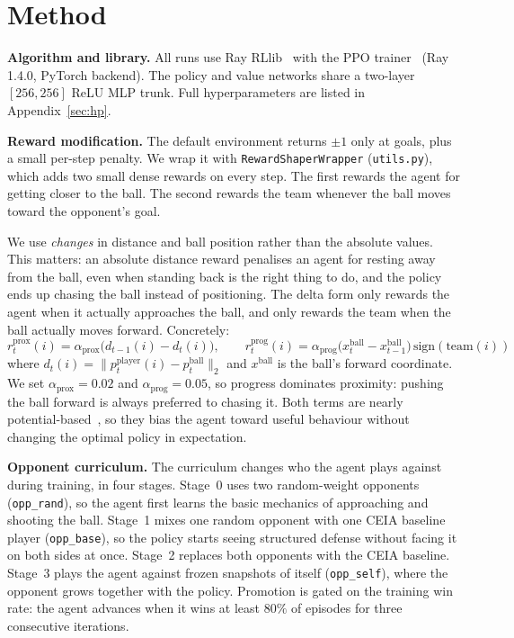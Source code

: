 \documentclass{article}
\begin{document}
\section{Method}
\label{sec:method}

\textbf{Algorithm and library.}
All runs use Ray RLlib~\citep{Liang2018RLlib} with the PPO trainer~\citep{Schulman2017PPO} (Ray 1.4.0, PyTorch backend).
The policy and value networks share a two-layer $[256,256]$ ReLU MLP trunk.
Full hyperparameters are listed in Appendix~\ref{sec:hp}.

\textbf{Reward modification.}
The default environment returns $\pm 1$ only at goals, plus a small per-step penalty.
We wrap it with \texttt{RewardShaperWrapper} (\texttt{utils.py}), which adds two small dense rewards on every step.
The first rewards the agent for getting closer to the ball.
The second rewards the team whenever the ball moves toward the opponent's goal.

We use \emph{changes} in distance and ball position rather than the absolute values.
This matters: an absolute distance reward penalises an agent for resting away from the ball, even when standing back is the right thing to do, and the policy ends up chasing the ball instead of positioning.
The delta form only rewards the agent when it actually approaches the ball, and only rewards the team when the ball actually moves forward.
Concretely:
\begin{equation}
r^{\text{prox}}_t(i) = \alpha_{\text{prox}}\bigl(d_{t-1}(i)-d_t(i)\bigr), \qquad
r^{\text{prog}}_t(i) = \alpha_{\text{prog}}\bigl(x^{\text{ball}}_t - x^{\text{ball}}_{t-1}\bigr)\,\mathrm{sign}(\mathrm{team}(i))
\label{eq:shaping}
\end{equation}
where $d_t(i)=\lVert p^{\text{player}}_t(i)-p^{\text{ball}}_t\rVert_2$ and $x^{\text{ball}}$ is the ball's forward coordinate.
We set $\alpha_{\text{prox}}{=}0.02$ and $\alpha_{\text{prog}}{=}0.05$, so progress dominates proximity: pushing the ball forward is always preferred to chasing it.
Both terms are nearly potential-based~\citep{Ng1999RewardShaping}, so they bias the agent toward useful behaviour without changing the optimal policy in expectation.

\textbf{Opponent curriculum.}
The curriculum changes who the agent plays against during training, in four stages.
Stage~0 uses two random-weight opponents (\texttt{opp\_rand}), so the agent first learns the basic mechanics of approaching and shooting the ball.
Stage~1 mixes one random opponent with one CEIA baseline player (\texttt{opp\_base}), so the policy starts seeing structured defense without facing it on both sides at once.
Stage~2 replaces both opponents with the CEIA baseline.
Stage~3 plays the agent against frozen snapshots of itself (\texttt{opp\_self}), where the opponent grows together with the policy.
Promotion is gated on the training win rate: the agent advances when it wins at least $80\%$ of episodes for three consecutive iterations.
\end{document}
